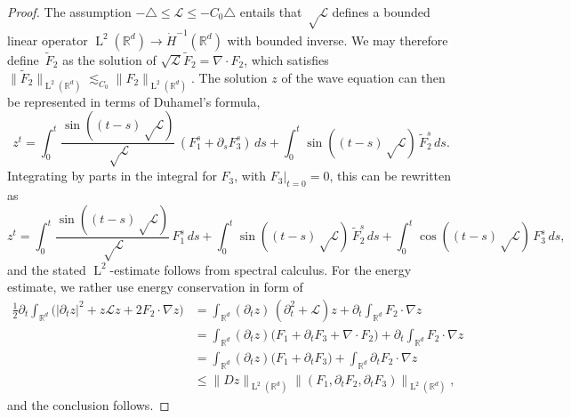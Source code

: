 \documentclass[10pt,a4paper]{article}
\theoremstyle{plain}
\theoremstyle{definition}
\numberwithin{equation}{section}
\newcommand{\Lc}{\mathcal{L}}
\newcommand{\R}{\mathbb R}
\newcommand{\Ld}{\operatorname{L}}
\begin{document}
\begin{proof}
The assumption $-\triangle\le\Lc\le-C_0\triangle$ entails that $\sqrt\Lc$ defines a bounded linear operator $\Ld^2(\R^d)\to\dot H^{-1}(\R^d)$ with bounded inverse. We may therefore define~$\tilde F_2$ as the solution of $\sqrt{\Lc} \tilde F_2=\nabla\cdot F_2$, which satisfies $\|\tilde F_2\|_{\Ld^2(\R^d)}\lesssim_{C_0}\|F_2\|_{\Ld^2(\R^d)}$.
The solution $z$ of the wave equation can then be represented in terms of Duhamel's formula,
\[z^t=\int_0^t\frac{\sin((t-s)\sqrt\Lc)}{\sqrt\Lc}\,(F_1^s+\partial_s F_3^s)\,ds+\int_0^t\sin((t-s)\sqrt\Lc)\,\tilde F_2^s\,ds.\]
Integrating by parts in the integral for $F_3$, with $F_3|_{t=0}=0$, this can be rewritten as
\[z^t=\int_0^t\frac{\sin((t-s)\sqrt\Lc)}{\sqrt\Lc}\,F_1^s\,ds+\int_0^t\sin((t-s)\sqrt\Lc)\,\tilde F_2^s\,ds+\int_0^t\cos((t-s)\sqrt\Lc)\,F_3^s\,ds,\]
and the stated $\Ld^2$-estimate follows from spectral calculus.
For the energy estimate, we rather use energy conservation in form of
\begin{align*}
\tfrac12\partial_t\int_{\R^d}\big(|\partial_tz|^2+z\Lc z+2F_2\cdot\nabla z\big)
&=\int_{\R^d} (\partial_tz)\,(\partial^2_t+\Lc)z+\partial_t\int_{\R^d}F_2\cdot\nabla z\\
&=\int_{\R^d}(\partial_tz)\big(F_1+\partial_tF_3+\nabla\cdot F_2\big)+\partial_t\int_{\R^d}F_2\cdot\nabla z\\
&=\int_{\R^d}(\partial_tz)\big(F_1+\partial_tF_3\big)+\int_{\R^d}\partial_tF_2\cdot\nabla z\\
&\le\|Dz\|_{\Ld^2(\R^d)}\|(F_1,\partial_tF_2,\partial_t F_3)\|_{\Ld^2(\R^d)},
\end{align*}
and the conclusion follows.
\end{proof}
\end{document}
